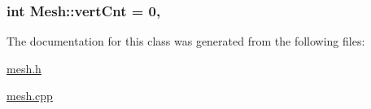 \subsubsection[{\texorpdfstring{vert\+Cnt}{vertCnt}}]{\setlength{\rightskip}{0pt plus 5cm}int Mesh\+::vert\+Cnt = 0\hspace{0.3cm}{\ttfamily [static]}, {\ttfamily [private]}}\hypertarget{classMesh_a4d39ee3e6f94b387fa5b611e4acdf492}{}\label{classMesh_a4d39ee3e6f94b387fa5b611e4acdf492}


The documentation for this class was generated from the following files\+:\begin{DoxyCompactItemize}
\item 
\hyperlink{mesh_8h}{mesh.\+h}\item 
\hyperlink{mesh_8cpp}{mesh.\+cpp}\end{DoxyCompactItemize}
